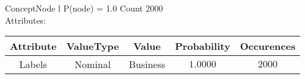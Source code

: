 
 
ConceptNode l \hspace{1cm} P(node) = 1.0 \hspace{1cm} Count 2000
\\ Attributes: \\ 
 \begin{table}[h] 
  \centering 
 \begin{longtable}{|c|c|c|c|c|} \hline 
Attribute & ValueType & Value & Probability & Occurences \\ \hline 
\multirow{1}{*}{Labels} & Nominal & Business & $1.0000$ & $2000$ \\ \hline 
\end{longtable}
 \end{table} 

